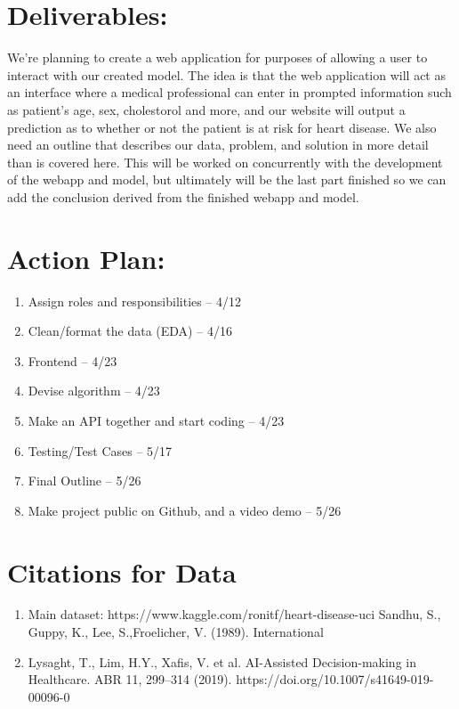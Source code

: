 \documentclass[12pt]{article}
\begin{document}
\section*{\normalsize Deliverables: }

We’re planning to create a web application for purposes of allowing a user 
to interact with our created model. The idea is that the web application 
will act as an interface where a medical professional can enter in prompted 
information such as patient’s age, sex, cholestorol and more, and our 
website will output a prediction as to whether or not the patient is at 
risk for heart disease. We also need an outline that describes our data, 
problem, and solution in more detail than is covered here. This will be 
worked on concurrently with the development of the webapp and model, but 
ultimately will be the last part finished so we can add the conclusion 
derived from the finished webapp and model.

\section*{\normalsize Action Plan: }
\begin{enumerate}[topsep=0pt,itemsep=-1ex,partopsep=1ex,parsep=1ex]
    \item Assign roles and responsibilities -- 4/12
    \item Clean/format the data (EDA) -- 4/16
    \item Frontend -- 4/23
    \item Devise algorithm -- 4/23
    \item Make an API together and start coding -- 4/23
    \item Testing/Test Cases -- 5/17
    \item Final Outline -- 5/26
    \item Make project public on Github, and a video demo -- 5/26   
\end{enumerate}

\section*{\normalsize Citations for Data}
\begin{enumerate}[topsep=0pt,itemsep=-1ex,partopsep=1ex,parsep=1ex]
    \item Main dataset: https://www.kaggle.com/ronitf/heart-disease-uci    Sandhu, S., Guppy, K., Lee, S.,Froelicher, V. (1989). International 
    \item Lysaght, T., Lim, H.Y., Xafis, V. et al. AI-Assisted Decision-making in Healthcare. ABR 11, 299–314 (2019). https://doi.org/10.1007/s41649-019-00096-0
\end{enumerate}
\end{document}
